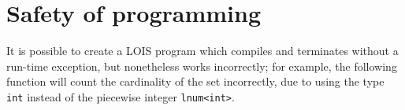 %
%
%

\section{Safety of programming}\label{subsecsafety}

It is possible to create a LOIS program which compiles and terminates without
a run-time exception, but nonetheless works incorrectly; for example, 
the following function will count the cardinality of the set incorrectly,
due to using the type \verb-int- instead of the piecewise integer \verb-lnum<int>-.

